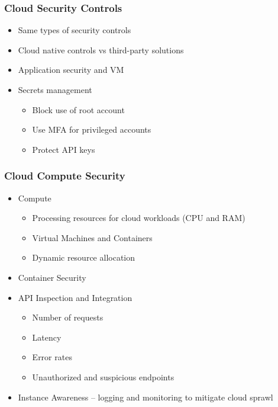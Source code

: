 		\subsubsection {Cloud Security Controls}
			\begin{itemize}
				\item Same types of security controls
				\item Cloud native controls vs third-party solutions
				\item Application security and VM
				\item Secrets management
					\begin{itemize}
						\item Block use of root account
						\item Use MFA for privileged accounts
						\item Protect API keys
					\end{itemize}
			\end{itemize}
		\subsubsection {Cloud Compute Security}
			\begin{itemize}
				\item Compute
					\begin{itemize}
						\item Processing resources for cloud workloads (CPU and RAM)
						\item Virtual Machines and Containers
						\item Dynamic resource allocation
					\end{itemize}
				\item Container Security
				\item API Inspection and Integration
					\begin{itemize}
						\item Number of requests
						\item Latency
						\item Error rates
						\item Unauthorized and suspicious endpoints
					\end{itemize}
				\item Instance Awareness -- logging and monitoring to mitigate cloud sprawl
			\end{itemize}
